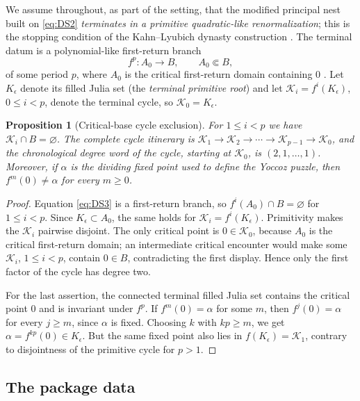 \documentclass[11pt,reqno]{amsart}
\numberwithin{equation}{section}
\theoremstyle{plain}
\newtheorem{proposition}[theorem]{Proposition}
\theoremstyle{definition}
\theoremstyle{remark}
\newcommand{\Kcyc}{\mathcal K}
\newcommand{\rootK}{K_{\epsilon}}
\begin{document}
We assume throughout, as part of the setting, that the modified
principal nest built on \eqref{eq:DS2} \emph{terminates in a primitive
quadratic-like renormalization}; this is the stopping condition of the
Kahn--Lyubich dynasty construction \cite{KLPrincipal09}.  The terminal
datum is a polynomial-like first-return branch
\begin{equation}
 f^{p}\colon A_0\longrightarrow B,
 \qquad
 A_0\Subset B,
\label{eq:DS3}
\end{equation}
of some period $p$, where $A_0$ is the critical first-return domain
containing $0$ \cite{KLPrincipal09,DH85}.  Let $\rootK$ denote its
filled Julia set (the \emph{terminal primitive root}) and let
$\Kcyc_i=f^i(\rootK)$, $0\le i<p$, denote the terminal cycle, so
$\Kcyc_0=\rootK$.

\begin{proposition}[Critical-base cycle exclusion]
\label{prop:cycle-exclusion}
For $1\le i<p$ we have $\Kcyc_i\cap B=\varnothing$.  The complete cycle
itinerary is
$\Kcyc_1\to\Kcyc_2\to\cdots\to\Kcyc_{p-1}\to\Kcyc_0$, and the
chronological degree word of the cycle, starting at $\Kcyc_0$, is
$(2,1,\ldots,1)$.  Moreover, if $\alpha$ is the dividing fixed point
used to define the Yoccoz puzzle, then
$f^m(0)\ne\alpha$ for every $m\ge0$.
\end{proposition}

\begin{proof}
Equation \eqref{eq:DS3} is a first-return branch, so
$f^i(A_0)\cap B=\varnothing$ for $1\le i<p$.  Since
$\rootK\subset A_0$, the same holds for $\Kcyc_i=f^i(\rootK)$.
Primitivity makes the $\Kcyc_i$ pairwise disjoint.  The only critical
point is $0\in\Kcyc_0$, because $A_0$ is the critical first-return
domain; an intermediate critical encounter would make some $\Kcyc_i$,
$1\le i<p$, contain $0\in B$, contradicting the first display.  Hence
only the first factor of the cycle has degree two.

For the last assertion, the connected terminal filled Julia set
contains the critical point $0$ and is invariant under $f^p$.
If $f^m(0)=\alpha$ for some $m$, then $f^j(0)=\alpha$ for every
$j\ge m$, since $\alpha$ is fixed.  Choosing $k$ with $kp\ge m$,
we get $\alpha=f^{kp}(0)\in\rootK$.  But the same fixed point
also lies in $f(\rootK)=\Kcyc_1$, contrary to disjointness
of the primitive cycle for $p>1$.
\end{proof}

\subsection{The package data}
\label{sec:setting-package}
\end{document}
